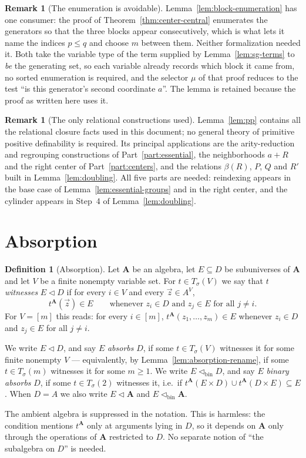 \documentclass[11pt]{article}
\theoremstyle{mainplain}
\theoremstyle{mainroman}
\theoremstyle{definition}
\newtheorem{definition}[theorem]{Definition}
\newtheorem{remark}[theorem]{Remark}
\numberwithin{equation}{section}
\newcommand{\bA}{\mathbf A}
\newcommand{\ab}{\lhd}
\newcommand{\abin}{\lhd_{\mathrm{bin}}}
\newcommand{\Tm}{T_\sigma}
\begin{document}
\begin{remark}[The enumeration is avoidable]\label{rem:enumeration-avoidable}
Lemma~\ref{lem:block-enumeration} has one consumer: the proof of
Theorem~\ref{thm:center-central} enumerates the generators so that the three
blocks appear consecutively, which is what lets it name the indices $p\le q$
and choose $m$ between them. Neither formalization needed it. Both take the
variable type of the term supplied by Lemma~\ref{lem:sg-terms} to \emph{be} the
generating set, so each variable already records which block it came from, no
sorted enumeration is required, and the selector $\mu$ of that proof reduces to
the test ``is this generator's second coordinate $a$''. The lemma is retained
because the proof as written here uses it.
\end{remark}

\begin{remark}[The only relational constructions used]\label{rem:pp-usage}
Lemma~\ref{lem:pp} contains all the relational closure facts used in this
document; no general theory of primitive positive definability is required.
Its principal applications are the arity-reduction and regrouping
constructions of Part~\ref{part:essential}, the neighborhoods $a+R$ and the
right center of Part~\ref{part:centers}, and the relations $\beta(R)$, $P$, $Q$
and $R'$ built in Lemma~\ref{lem:doubling}. All five parts are needed:
reindexing appears in the base case of Lemma~\ref{lem:essential-groups} and in
the right center, and the cylinder appears in Step~4 of
Lemma~\ref{lem:doubling}.
\end{remark}

\section{Absorption}\label{sec:absorption}

\begin{definition}[Absorption]\label{def:absorption}
Let $\bA$ be an algebra, let $E\subseteq D$ be subuniverses of $\bA$ and let
$V$ be a finite nonempty variable set. For $t\in\Tm(V)$ we say that $t$
\emph{witnesses} $E\ab D$ if for every $i\in V$ and every $\vec z\in A^{V}$,
\[
 t^{\bA}(\vec z)\in E
 \qquad\text{whenever } z_i\in D \text{ and } z_j\in E \text{ for all }j\ne i .
\]
For $V=[m]$ this reads: for every $i\in[m]$, $t^{\bA}(z_1,\dots,z_m)\in E$
whenever $z_i\in D$ and $z_j\in E$ for all $j\ne i$.

We write $E\ab D$, and say $E$ \emph{absorbs} $D$, if some $t\in\Tm(V)$
witnesses it for some finite nonempty $V$ --- equivalently, by
Lemma~\ref{lem:absorption-rename}, if some $t\in\Tm(m)$ witnesses it for some
$m\ge1$. We write $E\abin D$, and say $E$ \emph{binary absorbs} $D$, if some
$t\in\Tm(2)$ witnesses it, i.e.\ if
$t^{\bA}(E\times D)\cup t^{\bA}(D\times E)\subseteq E$. When $D=A$ we also
write $E\ab\bA$ and $E\abin\bA$.

The ambient algebra is suppressed in the notation. This is harmless: the
condition mentions $t^{\bA}$ only at arguments lying in $D$, so it depends on
$\bA$ only through the operations of $\bA$ restricted to $D$. No separate
notion of ``the subalgebra on $D$'' is needed.
\end{definition}
\end{document}

